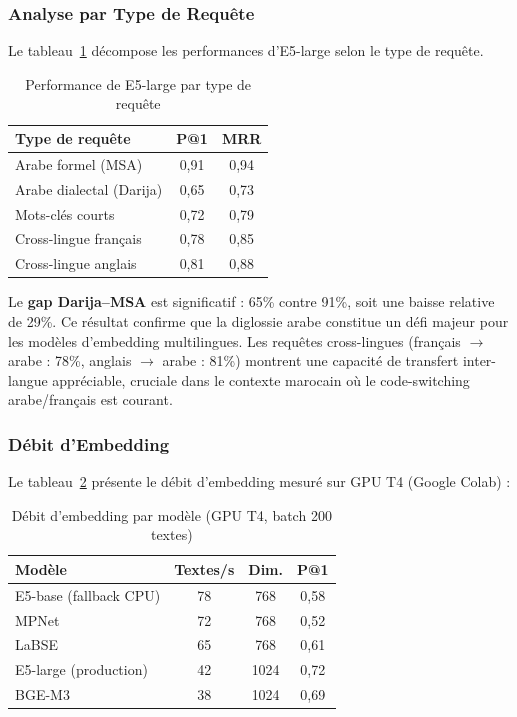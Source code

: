 \subsubsection{Analyse par Type de Requête}

Le tableau~\ref{tab:embed_by_type} décompose les performances d'E5-large selon
le type de requête.

\begin{table}[H]
\centering
\caption{Performance de E5-large par type de requête}
\label{tab:embed_by_type}
\begin{tabular}{lcc}
\toprule
\textbf{Type de requête} & \textbf{P@1} & \textbf{MRR} \\
\midrule
Arabe formel (MSA)       & 0,91 & 0,94 \\
Arabe dialectal (Darija) & 0,65 & 0,73 \\
Mots-clés courts         & 0,72 & 0,79 \\
Cross-lingue français    & 0,78 & 0,85 \\
Cross-lingue anglais     & 0,81 & 0,88 \\
\bottomrule
\end{tabular}
\end{table}

Le \textbf{gap Darija--MSA} est significatif : 65\% contre 91\%, soit une
baisse relative de 29\%. Ce résultat confirme que la diglossie arabe constitue
un défi majeur pour les modèles d'embedding multilingues. Les requêtes
cross-lingues (français $\to$ arabe : 78\%, anglais $\to$ arabe : 81\%)
montrent une capacité de transfert inter-langue appréciable, cruciale dans
le contexte marocain où le code-switching arabe/français est courant.

\subsubsection{Débit d'Embedding}

Le tableau~\ref{tab:embed_speed} présente le débit d'embedding mesuré sur GPU
T4 (Google Colab) :

\begin{table}[H]
\centering
\caption{Débit d'embedding par modèle (GPU T4, batch 200 textes)}
\label{tab:embed_speed}
\begin{tabular}{lccc}
\toprule
\textbf{Modèle} & \textbf{Textes/s} & \textbf{Dim.} & \textbf{P@1} \\
\midrule
E5-base (fallback CPU) & 78 & 768 & 0,58 \\
MPNet                 & 72 & 768 & 0,52 \\
LaBSE                 & 65 & 768 & 0,61 \\
E5-large (production) & 42 & 1024 & 0,72 \\
BGE-M3                & 38 & 1024 & 0,69 \\
\bottomrule
\end{tabular}
\end{table}

